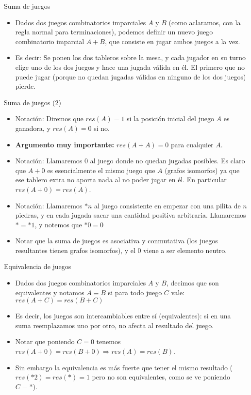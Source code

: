 \documentclass{beamer}
\begin{document}
\begin{frame}{Suma de juegos}
    \begin{itemize}
        \item Dados dos juegos combinatorios imparciales $A$ y $B$ (como aclaramos, con la regla normal para terminaciones), podemos
        definir un nuevo juego combinatorio imparcial $A+B$, que consiste en jugar ambos juegos a la vez.
        \item Es decir: Se ponen los dos tableros sobre la mesa, y cada jugador en su turno elige uno de los dos juegos y hace una
        jugada válida en él. El primero que no puede jugar (porque no quedan jugadas válidas en ninguno de los dos juegos) pierde.
    \end{itemize}
\end{frame}

\begin{frame}{Suma de juegos (2)}
    \begin{itemize}
        \item Notación: Diremos que $res(A) = 1$ si la posición inicial del juego $A$ es ganadora, y $res(A) = 0$ si no.
        \item \textbf{Argumento muy importante:} $res(A+A) = 0$ para cualquier $A$.
        \item Notación: Llamaremos $0$ al juego donde no quedan jugadas posibles. Es claro que $A+0$ es esencialmente el mismo
        juego que $A$ (grafos isomorfos) ya que ese tablero extra no aporta nada al no poder jugar en él. En particular $res(A+0) = res(A)$.
        \item Notación: Llamaremos $*n$ al juego consistente en empezar con una pilita de $n$ piedras, y en cada jugada sacar una cantidad positiva arbitraria. Llamaremos $* = *1$, y notemos que $*0 = 0$
        \item Notar que la suma de juegos es asociativa y conmutativa (los juegos resultantes tienen grafos isomorfos), y el $0$ viene a ser elemento neutro.
    \end{itemize}
\end{frame}

    
\begin{frame}{Equivalencia de juegos}
    \begin{itemize}
        \item Dados dos juegos combinatorios imparciales $A$ y $B$, decimos que son equivalentes y notamos $A \equiv B$ si para todo juego $C$ vale:
        $res(A+C) = res(B+C)$
        \item Es decir, los juegos son intercambiables entre sí (equivalentes): si en una suma reemplazamos uno por otro, no
        afecta al resultado del juego.
        \item Notar que poniendo $C=0$ tenemos $res(A+0) = res(B+0) \Rightarrow res(A) = res(B)$.
        \item Sin embargo la equivalencia es más fuerte que tener el mismo resultado ($res(*2) = res(*) = 1$ pero no son equivalentes, como se ve poniendo $C = *$).
    \end{itemize}
\end{frame}
\end{document}
